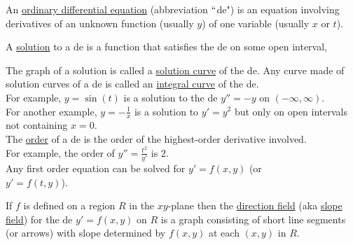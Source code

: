 \documentclass{ximera}
\begin{document}
\begin{large}

\vspace{1cm}

 An \underline{ordinary differential equation} (abbreviation $``$de")  is an equation involving derivatives of an unknown function  (usually $y$)  of one variable  (usually $x$ or $t$).

  A \underline{solution} to a de  is a function  that satisfies the de  on some open interval, 

\newpage

 The graph of a solution is called a \underline{solution curve} of the de.    Any curve made of solution curves of a de is called an \underline{integral curve} of the de.  \\


  For example, $y=\sin{(t)}$ is a solution to the de $y''=-y$  on $(-\infty,\infty)$.\\

 For another example, $y=-\frac{1}{x}$ is a solution to $y'=y^2$  but only on open intervals not containing $x=0$.\\

 The \underline{order} of a de is the order of the highest-order derivative involved.  \\

 For example, the order of $y''=\frac{t^2}{y'}$ is $2$.\\


 Any first order equation can be solved for $y'=f(x,y)$ (or \\$y'=f(t,y)$).  

 If $f$ is defined on a region $R$ in the $xy$-plane then the \underline{direction field} (aka \underline{slope field}) for the de $y'=f(x,y)$ on $R$ is a graph consisting of short line segments (or arrows) with slope determined by $f(x,y)$ at each $(x,y)$ in $R$.\\


\end{large}
\end{document}
